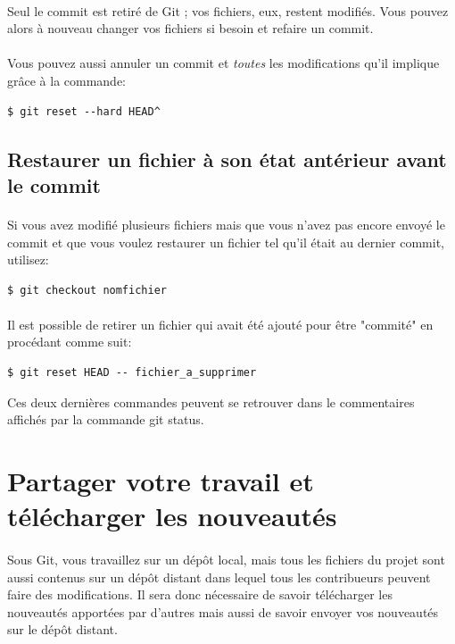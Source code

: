 \documentclass[french, a4paper, 12pt, titlepage]{article}
\begin{document}
\paragraph{}Seul le commit est retiré de Git ; vos fichiers, eux, restent modifiés. Vous pouvez alors à nouveau changer vos fichiers si besoin et refaire un commit.
\paragraph{}Vous pouvez aussi annuler un commit et \emph{toutes} les modifications qu'il implique grâce à la commande:
\begin{lstlisting}
$ git reset --hard HEAD^
\end{lstlisting}

\subsection{Restaurer un fichier à son état antérieur avant le commit}
\paragraph{}Si vous avez modifié plusieurs fichiers mais que vous n’avez pas encore envoyé le commit et que vous voulez restaurer un fichier tel qu’il était au dernier commit, utilisez:
\begin{lstlisting}
$ git checkout nomfichier
\end{lstlisting}
\paragraph{}Il est possible de retirer un fichier qui avait été ajouté pour être "commité" en procédant comme suit:
\begin{lstlisting}
$ git reset HEAD -- fichier_a_supprimer
\end{lstlisting}

Ces deux dernières commandes peuvent se retrouver dans le commentaires affichés par la commande git status.

\section{Partager votre travail et télécharger les nouveautés}
\paragraph{}Sous Git, vous travaillez sur un dépôt local, mais tous les fichiers du projet sont aussi contenus sur un dépôt distant dans lequel tous les contribueurs peuvent faire des modifications. Il sera donc nécessaire de savoir télécharger les nouveautés apportées par d'autres mais aussi de savoir envoyer vos nouveautés sur le dépôt distant.
\end{document}

